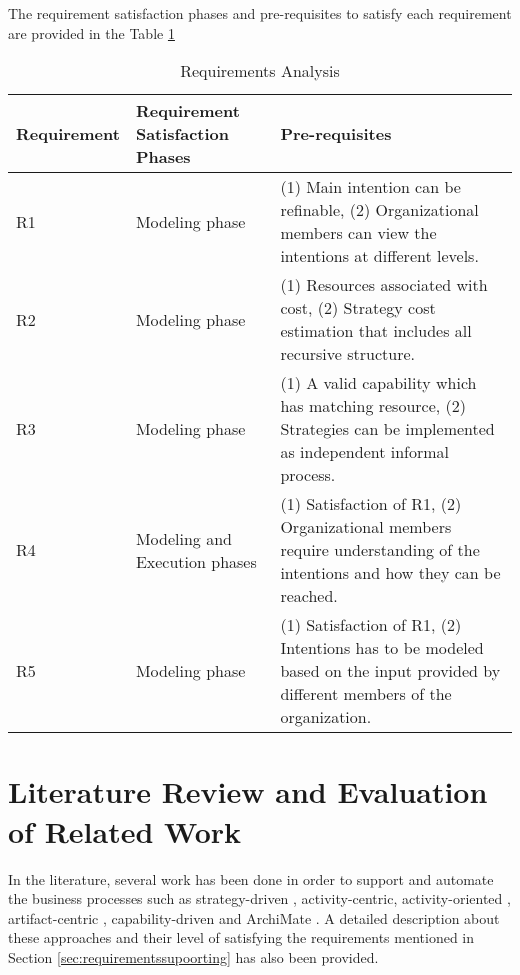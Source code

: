  The requirement satisfaction phases and pre-requisites to satisfy each requirement are provided in the Table \ref{tab:subrequirements}

\begin{table} [htbp]
	\centering
	\begin{tabular} {p{2.5cm}p{3cm}p{8cm}}
		\toprule
		\textbf{Requirement} & \textbf{Requirement Satisfaction Phases} & \textbf{Pre-requisites}    \\
		\midrule                                                                                                               
		R1    & Modeling phase    &(1) Main intention can be refinable, (2) Organizational members can view the intentions at different levels.    \\ 
		
		R2   & Modeling phase    &(1) Resources associated with cost, (2) Strategy cost estimation that includes all recursive structure. \\         
			
		R3   & Modeling phase       &(1) A valid capability which has matching resource, (2) Strategies can be implemented as independent informal process. \\      
		
		R4   & Modeling and Execution phases     &(1) Satisfaction of R1, (2) Organizational members require understanding of the intentions and how they can be reached. \\                         
			
		R5  &Modeling phase  &(1) Satisfaction of R1, (2) Intentions has to be modeled based on the input provided by different members of the organization.               \\ 
		    
		\bottomrule
	\end{tabular}
	\caption{Requirements Analysis}
	\label{tab:subrequirements}
\end{table}

\section{Literature Review and Evaluation of Related Work}
\label{sec:literaturereview}
In the literature, several work has been done in order to support and automate the business processes such as strategy-driven \cite{Bider2005}, activity-centric\cite{Yarosh2009}, activity-oriented \cite{Leymann2000}, artifact-centric \cite{Cohn2009}, capability-driven \cite{Stirna2012} and ArchiMate \cite{Group2012}.  A detailed description about these approaches and their level of satisfying the requirements mentioned in Section \ref{sec:requirementssupoorting} has also been provided. 

